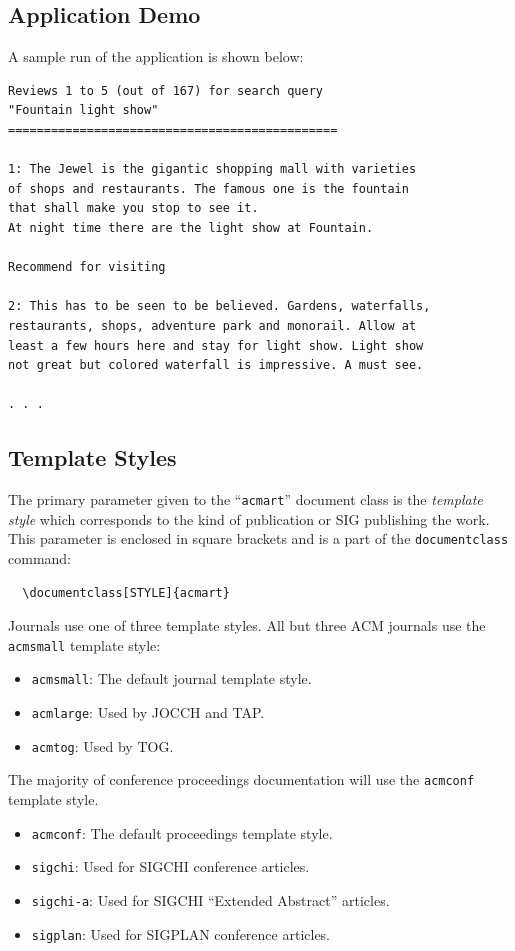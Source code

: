 \documentclass[sigconf,nonacm=true]{acmart}
\begin{document}
\subsection{Application Demo}
A sample run of the application is shown below:
\begin{verbatim}
Reviews 1 to 5 (out of 167) for search query 
"Fountain light show"
==============================================

1: The Jewel is the gigantic shopping mall with varieties
of shops and restaurants. The famous one is the fountain 
that shall make you stop to see it.  
At night time there are the light show at Fountain.

Recommend for visiting

2: This has to be seen to be believed. Gardens, waterfalls,
restaurants, shops, adventure park and monorail. Allow at 
least a few hours here and stay for light show. Light show 
not great but colored waterfall is impressive. A must see.

. . .
\end{verbatim}



\iffalse
\subsection{Template Styles}

The primary parameter given to the ``\verb|acmart|'' document class is
the {\itshape template style} which corresponds to the kind of publication
or SIG publishing the work. This parameter is enclosed in square
brackets and is a part of the {\verb|documentclass|} command:
\begin{verbatim}
  \documentclass[STYLE]{acmart}
\end{verbatim}

Journals use one of three template styles. All but three ACM journals
use the {\verb|acmsmall|} template style:
\begin{itemize}
\item {\verb|acmsmall|}: The default journal template style.
\item {\verb|acmlarge|}: Used by JOCCH and TAP.
\item {\verb|acmtog|}: Used by TOG.
\end{itemize}

The majority of conference proceedings documentation will use the {\verb|acmconf|} template style.
\begin{itemize}
\item {\verb|acmconf|}: The default proceedings template style.
\item{\verb|sigchi|}: Used for SIGCHI conference articles.
\item{\verb|sigchi-a|}: Used for SIGCHI ``Extended Abstract'' articles.
\item{\verb|sigplan|}: Used for SIGPLAN conference articles.
\end{itemize}
\end{document}
